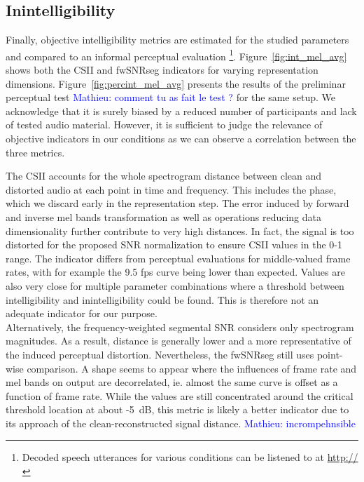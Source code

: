 \documentclass[final,3p,times,twocolumn]{elsarticle}
\newcommand{\ml}[1]{\textcolor{blue}{ Mathieu: #1}}
\begin{document}
\subsection{Inintelligibility}

Finally, objective intelligibility metrics are estimated for the studied parameters and compared to an informal perceptual evaluation \footnote{Decoded speech utterances for various conditions can be listened to at \url{http://}}. Figure~\ref{fig:int_mel_avg} shows both the CSII and fwSNRseg indicators for varying representation dimensions. Figure~\ref{fig:percint_mel_avg} presents the results of the preliminar perceptual test \ml{comment tu as fait le test ?} for the same setup. We acknowledge that it is surely biased by a reduced number of participants and lack of tested audio material. However, it is sufficient to judge the relevance of objective indicators in our conditions as we can observe a correlation between the three metrics.

The CSII accounts for the whole spectrogram distance between clean and distorted audio at each point in time and frequency. This includes the phase, which we discard early in the representation step. The error induced by forward and inverse mel bands transformation as well as operations reducing data dimensionality further contribute to very high distances. In fact, the signal is too distorted for the proposed SNR normalization to ensure CSII values in the 0-1 range. The indicator differs from perceptual evaluations for middle-valued frame rates, with for example the 9.5 fps curve being lower than expected. Values are also very close for multiple parameter combinations where a threshold between intelligibility and inintelligibility could be found. This is therefore not an adequate indicator for our purpose.\\

Alternatively, the frequency-weighted segmental SNR considers only spectrogram magnitudes. As a result, distance is generally lower and a more representative of the induced perceptual distortion.  Nevertheless, the fwSNRseg still uses point-wise comparison. A shape seems to appear where the influences of frame rate and mel bands on output are decorrelated, ie. almost the same curve is offset as a function of frame rate. While the values are still concentrated around the critical threshold location at about -5~dB, this metric is likely a better indicator due to its approach of the clean-reconstructed signal distance. \ml{incrompehnsible}
\end{document}
